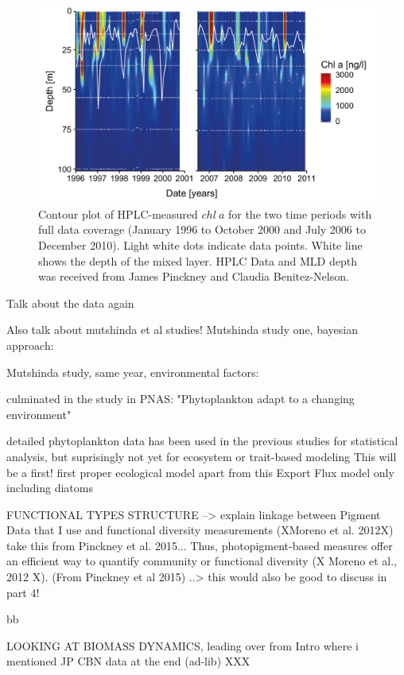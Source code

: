 \begin{figure}
\centering
\includegraphics[trim = 0mm 0mm 0mm 0mm, clip, width=.9\linewidth]{./Chp2-Pre/Pinckneyetal2015_TotChlAcontoursMLD.png}
\caption[Scheme]{\small {Contour plot of HPLC-measured $chl~a$ for the two time periods with full data coverage (January 1996 to October 2000 and July 2006 to December 2010). Light white dots indicate data points. White line shows the depth of the mixed layer. HPLC Data and MLD depth was received from James Pinckney and Claudia Benitez-Nelson.}}
\label{PrinComp}
\end{figure}


Talk about the data again

Also talk about mutshinda et al studies!
Mutshinda study one, bayesian approach: \cite{Mutshinda2013a}

Mutshinda study, same year, environmental factors: \cite{Mutshinda2013}

culminated in the study in PNAS: "Phytoplankton adapt to a changing environment" \cite{Irwin2015}

detailed phytoplankton data has been used in the previous studies for statistical analysis, but suprisingly not yet for ecosystem or trait-based modeling
This will be a first! first proper ecological model apart from this Export Flux model only including diatoms \citep{Walsh2002a}

FUNCTIONAL TYPES STRUCTURE --> explain linkage between Pigment Data that I use and functional diversity measurements (XMoreno et al. 2012X) take this from Pinckney et al. 2015...
Thus, photopigment-based measures offer an efficient way to quantify community or functional diversity (X Moreno et al., 2012 X). (From Pinckney et al 2015) ..> this would also be good to discuss in part 4!

bb


LOOKING AT BIOMASS DYNAMICS, leading over from Intro where i mentioned JP CBN data at the end (ad-lib)
XXX

